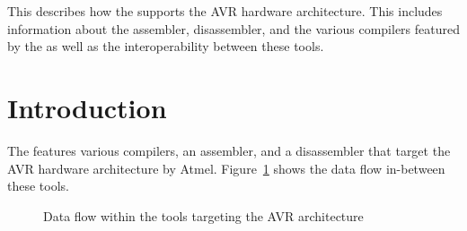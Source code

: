 




\renewcommand{\seeavr}{}

{This \documentation{} describes how the \ecs{} supports the AVR hardware architecture.
This includes information about the assembler, disassembler, and the various compilers featured by the \ecs{} as well as the interoperability between these tools.}

\section{Introduction}

The \ecs{} features various compilers, an assembler, and a disassembler that target the AVR hardware architecture by Atmel.
Figure~\ref{fig:avrdataflow} shows the data flow in-between these tools.

\begin{figure}
\caption{Data flow within the tools targeting the AVR architecture}
\label{fig:avrdataflow}
\end{figure}

